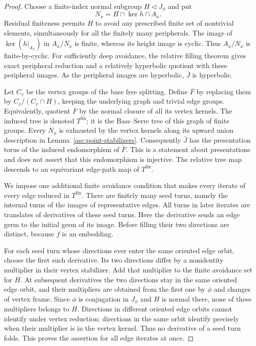 \begin{proof}
Choose a finite-index normal subgroup $H\lhd J_\phi$ and put
\[
 N_x=H\cap\ker h\cap A_x.
\]
Residual finiteness permits $H$ to avoid any prescribed finite set of
nontrivial elements, simultaneously for all the finitely many
peripherals. The image of $\ker(h|_{A_x})$ in $A_x/N_x$ is finite, whereas
its height image is cyclic. Thus $A_x/N_x$ is finite-by-cyclic.
For sufficiently deep avoidance, the relative filling theorem
\cite{Osin2007} gives exact peripheral reduction and a relatively
hyperbolic quotient with these peripheral images. As the peripheral
images are hyperbolic, $\bar J$ is hyperbolic.

Let $C_v$ be the vertex groups of the base free splitting. Define
$\bar F$ by replacing them by $C_v/(C_v\cap H)$, keeping the underlying
graph and trivial edge groups. Equivalently, quotient $F$ by the normal
closure of all its vertex kernels. The induced tree is denoted
$T^{\mathrm{fin}}$; it is the Bass--Serre tree of this graph of finite
groups. Every $N_x$ is exhausted by the vertex kernels along its upward
union description in Lemma~\ref{asc:point-stabilizers}. Consequently
$\bar J$ has the presentation torus of the induced endomorphism of
$\bar F$. This is a statement about presentations and does not assert
that this endomorphism is injective. The relative tree map descends to
an equivariant edge-path map of $T^{\mathrm{fin}}$.

We impose one additional finite avoidance condition that makes every
iterate of every edge reduced in $T^{\mathrm{fin}}$. There are finitely
many seed turns, namely the internal turns of the images of representative
edges. All turns in later iterates are translates of derivatives of
these seed turns. Here the derivative sends an edge germ to the initial
germ of its image. Before filling their two directions are distinct,
because $f$ is an embedding.

For each seed turn whose directions ever enter the same oriented edge
orbit, choose the first such derivative. Its two directions differ by
a nonidentity multiplier in their vertex stabilizer. Add that multiplier
to the finite avoidance set for $H$. At subsequent derivatives the two
directions stay in the same oriented edge orbit, and their multipliers
are obtained from the first one by $\phi$ and changes of vertex frame.
Since $\phi$ is conjugation in $J_\phi$ and $H$ is normal there, none of
these multipliers belongs to $H$. Directions in different oriented edge
orbits cannot identify under vertex reduction; directions in the same
orbit identify precisely when their multiplier is in the vertex kernel.
Thus no derivative of a seed turn folds. This proves the assertion for
all edge iterates at once.


\end{proof}
